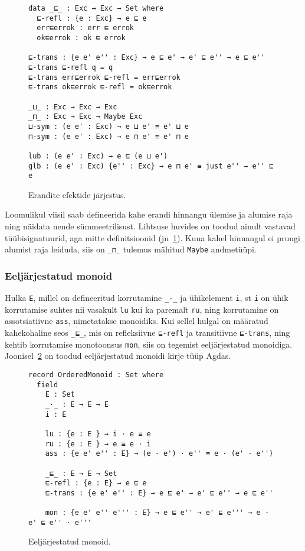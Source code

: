 \documentclass[a4paper,12pt]{article}
\begin{document}
\begin{figure}
  \begin{BVerbatim}
data _⊑_ : Exc → Exc → Set where
  ⊑-refl : {e : Exc} → e ⊑ e
  err⊑errok : err ⊑ errok
  ok⊑errok : ok ⊑ errok
  
⊑-trans : {e e' e'' : Exc} → e ⊑ e' → e' ⊑ e'' → e ⊑ e''
⊑-trans ⊑-refl q = q
⊑-trans err⊑errok ⊑-refl = err⊑errok
⊑-trans ok⊑errok ⊑-refl = ok⊑errok

_⊔_ : Exc → Exc → Exc
_⊓_ : Exc → Exc → Maybe Exc
⊔-sym : (e e' : Exc) → e ⊔ e' ≡ e' ⊔ e
⊓-sym : (e e' : Exc) → e ⊓ e' ≡ e' ⊓ e

lub : (e e' : Exc) → e ⊑ (e ⊔ e')
glb : (e e' : Exc) {e'' : Exc} → e ⊓ e' ≡ just e'' → e'' ⊑ e
  \end{BVerbatim}
  \caption{Erandite efektide järjestus.}
  \label{fig:exc.ord}
\end{figure}
Loomulikul viisil saab defineerida kahe erandi hinnangu ülemise ja alumise raja ning näidata nende sümmeetrilisust.
Lihtsuse huvides on toodud ainult vastavad tüübisignatuurid, aga mitte definitsioonid (jn~\ref{fig:exc.ord}).
Kuna kahel hinnangul ei pruugi alumist raja leiduda, siis on {\tt _⊓_} tulemus mähitud {\tt Maybe} andmetüüpi.

\subsubsection{Eeljärjestatud monoid}\label{sssec:ordered-monoid}
Hulka {\tt E}, millel on defineeritud korrutamine {\tt _·_} ja ühikelement {\tt i},
st {\tt i} on ühik korrutamise suhtes nii vasakult {\tt lu} kui ka paremalt {\tt ru},
ning korrutamine on assotsiatiivne {\tt ass}, nimetatakse monoidiks.
Kui sellel hulgal on määratud kahekohaline seos {\tt _⊑_},
mis on refleksiivne {\tt ⊑-refl} ja transitiivne {\tt ⊑-trans},
ning kehtib korrutamise monotoonsus {\tt mon},
siis on tegemist eeljärjestatud monoidiga.
Joonisel~\ref{fig:ordered-monoid} on toodud eeljärjestatud monoidi kirje tüüp Agdas.

\begin{figure}
  \begin{BVerbatim}
record OrderedMonoid : Set where
  field
    E : Set
    _·_ : E → E → E    
    i : E

    lu : {e : E } → i · e ≡ e
    ru : {e : E } → e ≡ e · i 
    ass : {e e' e'' : E} → (e · e') · e'' ≡ e · (e' · e'')
    
    _⊑_ : E → E → Set    
    ⊑-refl : {e : E} → e ⊑ e
    ⊑-trans : {e e' e'' : E} → e ⊑ e' → e' ⊑ e'' → e ⊑ e''

    mon : {e e' e'' e''' : E} → e ⊑ e'' → e' ⊑ e''' → e · e' ⊑ e'' · e'''
  \end{BVerbatim}
  \caption{Eeljärjestatud monoid.}
  \label{fig:ordered-monoid}
\end{figure}
\end{document}

